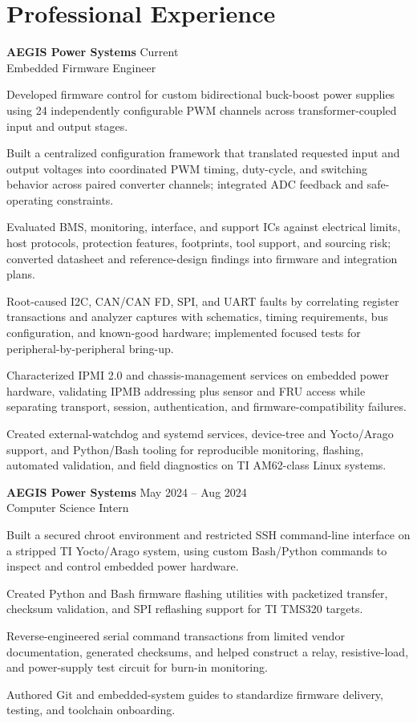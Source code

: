 \documentclass[10pt,letterpaper]{article}
\begin{document}
\section{Professional Experience}
\textbf{AEGIS Power Systems} \hfill Current\\
Embedded Firmware Engineer
\begin{compactitem}
  \item Developed firmware control for custom bidirectional buck-boost power supplies using 24 independently configurable PWM channels across transformer-coupled input and output stages.
  \item Built a centralized configuration framework that translated requested input and output voltages into coordinated PWM timing, duty-cycle, and switching behavior across paired converter channels; integrated ADC feedback and safe-operating constraints.
  \item Evaluated BMS, monitoring, interface, and support ICs against electrical limits, host protocols, protection features, footprints, tool support, and sourcing risk; converted datasheet and reference-design findings into firmware and integration plans.
  \item Root-caused I2C, CAN/CAN FD, SPI, and UART faults by correlating register transactions and analyzer captures with schematics, timing requirements, bus configuration, and known-good hardware; implemented focused tests for peripheral-by-peripheral bring-up.
  \item Characterized IPMI 2.0 and chassis-management services on embedded power hardware, validating IPMB addressing plus sensor and FRU access while separating transport, session, authentication, and firmware-compatibility failures.
  \item Created external-watchdog and systemd services, device-tree and Yocto/Arago support, and Python/Bash tooling for reproducible monitoring, flashing, automated validation, and field diagnostics on TI AM62-class Linux systems.
\end{compactitem}

\textbf{AEGIS Power Systems} \hfill May 2024 -- Aug 2024\\
Computer Science Intern
\begin{compactitem}
  \item Built a secured chroot environment and restricted SSH command-line interface on a stripped TI Yocto/Arago system, using custom Bash/Python commands to inspect and control embedded power hardware.
  \item Created Python and Bash firmware flashing utilities with packetized transfer, checksum validation, and SPI reflashing support for TI TMS320 targets.
  \item Reverse-engineered serial command transactions from limited vendor documentation, generated checksums, and helped construct a relay, resistive-load, and power-supply test circuit for burn-in monitoring.
  \item Authored Git and embedded-system guides to standardize firmware delivery, testing, and toolchain onboarding.
\end{compactitem}
\end{document}
